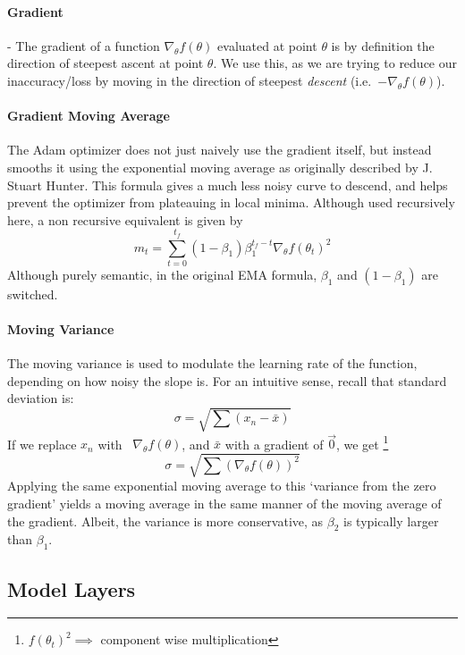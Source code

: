\documentclass[titlepage,letterpaper]{article}
\begin{document}
\paragraph{Gradient} - The gradient of a function $\nabla_\theta f(\theta)$ evaluated at point $\theta$ is by definition the direction of steepest ascent at point $\theta$. We use this, as we are trying to reduce our inaccuracy/loss by moving in the direction of steepest \textit{descent} \mbox{(i.e. $-\nabla_\theta f(\theta)$)}. 

\paragraph{Gradient Moving Average}

The Adam optimizer does not just naively use the gradient itself, but instead smooths it using the exponential moving average as originally described by J. Stuart Hunter\cite{EMA}. This formula gives a much less noisy curve to descend, and helps prevent the optimizer from plateauing in local minima. Although used recursively here, a non recursive equivalent is given by
\[m_t = \sum_{t=0}^{t_f} \left(1-\beta_1\right) \beta_1^{t_f-t}\nabla_\theta f\left(\theta_{t}\right)^2\]
Although purely semantic, in the original EMA formula, \(\beta_1\) and \(\left(1-\beta_1\right)\) are switched.


\paragraph{Moving Variance}
The moving variance is used to modulate the learning rate of the function, depending on how noisy the slope is. For an intuitive sense, recall that standard deviation is:
\[\sigma = \sqrt{\sum \left(x_n - \bar{x}\right)}\]
If we replace \(x_n\) with \ \(\nabla_\theta f(\theta)\), and \(\bar{x}\) with a gradient of \(\vec{0}\), we get \footnote{\(f\left(\theta_{t}\right)^2 \implies \) component wise multiplication}
\[\sigma = \sqrt{\sum \left(\nabla_\theta f(\theta)\right)^2}\]
Applying the same exponential moving average to this `variance from the zero gradient' yields a moving average in the same manner of the moving average of the gradient. Albeit, the variance is more conservative, as \(\beta_2\) is typically larger than \(\beta_1\).

\subsection{Model Layers}
\end{document}
